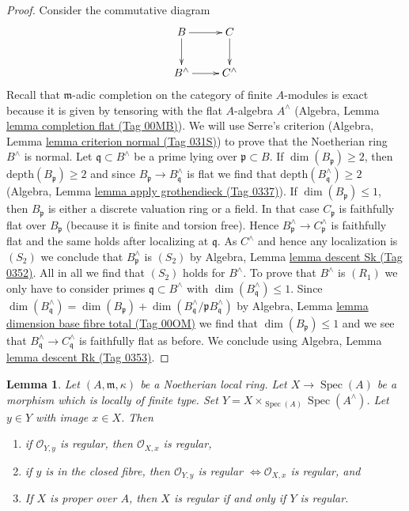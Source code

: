 \documentclass{amsart}
\theoremstyle{plain}
\newtheorem{lemma}[subsection]{Lemma}
\theoremstyle{definition}
\theoremstyle{remark}
\numberwithin{equation}{subsection}
\def\Spec{\mathop{\mathrm{Spec}}}
\begin{document}
\begin{proof}
Consider the commutative diagram
$$
\xymatrix{
B \ar[r] \ar[d] & C \ar[d] \\
B^\wedge \ar[r] & C^\wedge
}
$$
Recall that $\mathfrak m$-adic completion on the category of
finite $A$-modules is exact because it is given by tensoring with
the flat $A$-algebra $A^\wedge$
(Algebra, Lemma \href{https://stacks.math.columbia.edu/tag/00MB}{lemma completion flat (Tag 00MB)}).
We will use Serre's criterion
(Algebra, Lemma \href{https://stacks.math.columbia.edu/tag/031S}{lemma criterion normal (Tag 031S)})
to prove that the Noetherian ring $B^\wedge$ is normal.
Let $\mathfrak q \subset B^\wedge$ be a prime lying over
$\mathfrak p \subset B$. If $\dim(B_\mathfrak p) \geq 2$, then
$\text{depth}(B_\mathfrak p) \geq 2$ and since
$B_\mathfrak p \to B^\wedge_\mathfrak q$ is flat we find
that $\text{depth}(B^\wedge_\mathfrak q) \geq 2$
(Algebra, Lemma \href{https://stacks.math.columbia.edu/tag/0337}{lemma apply grothendieck (Tag 0337)}).
If $\dim(B_\mathfrak p) \leq 1$, then $B_\mathfrak p$ is
either a discrete valuation ring or a field.
In that case $C_\mathfrak p$ is faithfully flat over $B_\mathfrak p$
(because it is finite and torsion free).
Hence $B^\wedge_\mathfrak p \to C^\wedge_\mathfrak p$ is
faithfully flat and the same holds after localizing at $\mathfrak q$.
As $C^\wedge$ and hence any localization is $(S_2)$ we conclude that
$B^\wedge_\mathfrak p$ is $(S_2)$ by
Algebra, Lemma \href{https://stacks.math.columbia.edu/tag/0352}{lemma descent Sk (Tag 0352)}.
All in all we find that
$(S_2)$ holds for $B^\wedge$. To prove that $B^\wedge$ is
$(R_1)$ we only have to consider primes $\mathfrak q \subset B^\wedge$
with $\dim(B^\wedge_\mathfrak q) \leq 1$. Since
$\dim(B^\wedge_\mathfrak q) = \dim(B_\mathfrak p) +
\dim(B^\wedge_\mathfrak q/\mathfrak p B^\wedge_\mathfrak q)$ by
Algebra, Lemma \href{https://stacks.math.columbia.edu/tag/00OM}{lemma dimension base fibre total (Tag 00OM)}
we find that $\dim(B_\mathfrak p) \leq 1$ and
we see that $B^\wedge_\mathfrak q \to C^\wedge_\mathfrak q$
is faithfully flat as before. We conclude using
Algebra, Lemma \href{https://stacks.math.columbia.edu/tag/0353}{lemma descent Rk (Tag 0353)}.
\end{proof}


\begin{lemma}
\label{resolve-lemma-port-regularity-to-completion}
Let $(A, \mathfrak m, \kappa)$ be a Noetherian local ring.
Let $X \to \Spec(A)$ be a morphism which is locally of finite type.
Set $Y = X \times_{\Spec(A)} \Spec(A^\wedge)$. Let $y \in Y$ with
image $x \in X$. Then
\begin{enumerate}
\item if $\mathcal{O}_{Y, y}$ is regular, then $\mathcal{O}_{X, x}$
is regular,
\item if $y$ is in the closed fibre, then $\mathcal{O}_{Y, y}$ is regular
$\Leftrightarrow \mathcal{O}_{X, x}$ is regular, and
\item If $X$ is proper over $A$, then $X$ is regular
if and only if $Y$ is regular.
\end{enumerate}
\end{lemma}
\end{document}
